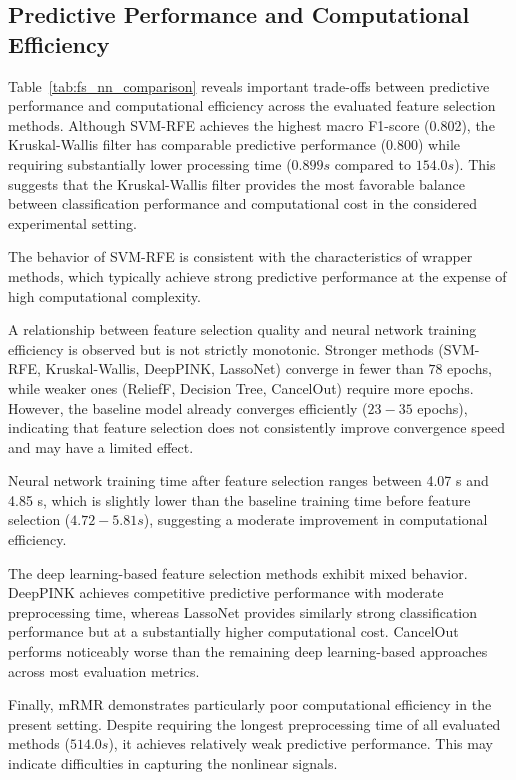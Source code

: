\subsection{Predictive Performance and Computational Efficiency}
Table~\ref{tab:fs_nn_comparison} reveals important trade-offs between predictive performance and computational efficiency across the evaluated feature selection methods. Although SVM-RFE achieves the highest macro F1-score (0.802), the Kruskal-Wallis filter has comparable predictive performance ($0.800$) while requiring substantially lower processing time ($0.899 s$ compared to $154.0 s$). This suggests that the Kruskal-Wallis filter provides the most favorable balance between classification performance and computational cost in the considered experimental setting.

The behavior of SVM-RFE is consistent with the characteristics of wrapper methods, which typically achieve strong predictive performance at the expense of high computational complexity. 

A relationship between feature selection quality and neural network training efficiency is observed but is not strictly monotonic. Stronger methods (SVM-RFE, Kruskal-Wallis, DeepPINK, LassoNet) converge in fewer than $78$ epochs, while \break weaker ones (ReliefF, Decision Tree, CancelOut) require more epochs. However, the baseline model already converges efficiently ($23-35$ epochs), indicating that feature selection does not consistently improve convergence speed and may have \break a limited effect.

Neural network training time after feature selection ranges between 4.07 s and 4.85 s, which is slightly lower than the baseline training time before feature selection ($4.72-5.81 s$), suggesting a moderate improvement in computational efficiency.

The deep learning-based feature selection methods exhibit mixed behavior. DeepPINK achieves competitive predictive performance with moderate preprocessing \break time, whereas LassoNet provides similarly strong classification performance but \break at a substantially higher computational cost. CancelOut performs noticeably worse than the remaining deep learning-based approaches across most evaluation metrics.

Finally, mRMR demonstrates particularly poor computational efficiency in the present setting. Despite requiring the longest preprocessing time of all evaluated methods ($514.0 s$), it achieves relatively weak predictive performance. This may indicate difficulties in capturing the nonlinear signals.


